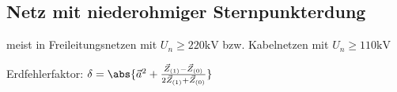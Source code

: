 \documentclass[german]{latex4ei/latex4ei_sheet}
\begin{document}
\begin{sectionbox}
	\subsection{Netz mit niederohmiger Sternpunkterdung}

	meist in Freileitungsnetzen mit $U_n \ge 220 \si{\kilo \volt} $ bzw. Kabelnetzen mit $U_n \ge 110 \si{\kilo \volt}$

	Erdfehlerfaktor: $\delta = \abs{\vec a^2 + \frac{\vec Z_{(1)}  - \vec Z_{(0)}}{2 \vec Z_{(1)} + \vec Z_{(0)}}} $
\end{sectionbox}
\end{document}
